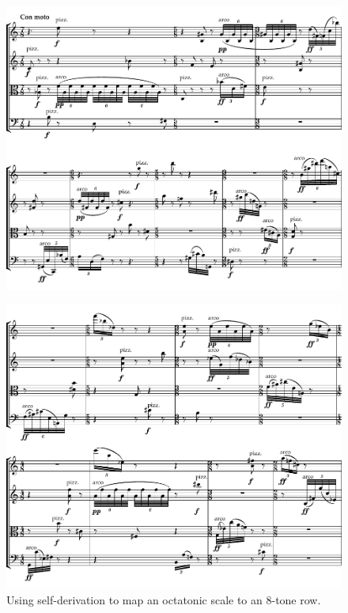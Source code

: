 \begin{figure}[H]
\centering
\includegraphics[width=6.5in]{figures/Example_Quartet_1.pdf}
\end{figure}

\begin{figure}[H]
\centering
\includegraphics[width=6.5in]{figures/Example_Quartet_2.pdf}
\caption[Using self-derivation with an octatonic scale.]{Using self-derivation to map an octatonic scale to an 8-tone row.}
\label{fig:quartet}
\end{figure}

